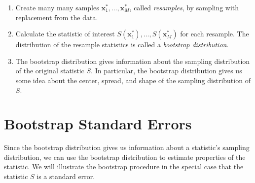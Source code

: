 \documentclass[captions=tableheading]{scrbook}
\begin{document}
\begin{enumerate}
\item Create many many samples \(\mathbf{x}_{1}^{\ast},\ldots,\mathbf{x}_{M}^{\ast}\), called \emph{resamples}, by sampling with replacement from the data.
\item Calculate the statistic of interest \(S(\mathbf{x}_{1}^{\ast}),\ldots,S(\mathbf{x}_{M}^{\ast})\) for each resample. The distribution of the resample statistics is called a \emph{bootstrap distribution}.
\item The bootstrap distribution gives information about the sampling distribution of the original statistic \(S\). In particular, the bootstrap distribution gives us some idea about the center, spread, and shape of the sampling distribution of \(S\).
\end{enumerate}
\section{Bootstrap Standard Errors}
\label{sec-13-2}

\label{sec:Bootstrap-Standard-Errors}

Since the bootstrap distribution gives us information about a statistic's sampling distribution, we can use the bootstrap distribution to estimate properties of the statistic. We will illustrate the bootstrap procedure in the special case that the statistic \(S\) is a standard error. 
\end{document}
